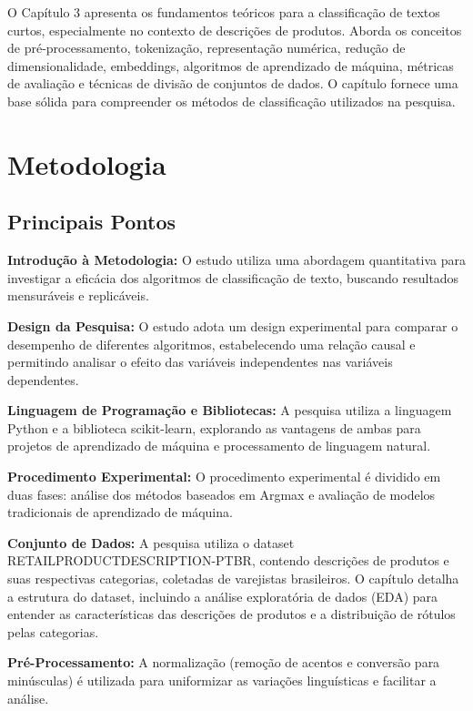 \documentclass{report}
\begin{document}
O Capítulo 3 apresenta os fundamentos teóricos para a classificação de textos curtos, especialmente no contexto de descrições de produtos. Aborda os conceitos de pré-processamento, tokenização, representação numérica, redução de dimensionalidade, embeddings, algoritmos de aprendizado de máquina, métricas de avaliação e técnicas de divisão de conjuntos de dados. O capítulo fornece uma base sólida para compreender os métodos de classificação utilizados na pesquisa.

\chapter{Metodologia}

\section*{Principais Pontos}

\textbf{Introdução à Metodologia:} O estudo utiliza uma abordagem quantitativa para investigar a eficácia dos algoritmos de classificação de texto, buscando resultados mensuráveis e replicáveis.

\textbf{Design da Pesquisa:} O estudo adota um design experimental para comparar o desempenho de diferentes algoritmos, estabelecendo uma relação causal e permitindo analisar o efeito das variáveis independentes nas variáveis dependentes.

\textbf{Linguagem de Programação e Bibliotecas:} A pesquisa utiliza a linguagem Python e a biblioteca scikit-learn, explorando as vantagens de ambas para projetos de aprendizado de máquina e processamento de linguagem natural.

\textbf{Procedimento Experimental:} O procedimento experimental é dividido em duas fases: análise dos métodos baseados em Argmax e avaliação de modelos tradicionais de aprendizado de máquina.

\textbf{Conjunto de Dados:} A pesquisa utiliza o dataset RETAILPRODUCTDESCRIPTION-PTBR, contendo descrições de produtos e suas respectivas categorias, coletadas de varejistas brasileiros. O capítulo detalha a estrutura do dataset, incluindo a análise exploratória de dados (EDA) para entender as características das descrições de produtos e a distribuição de rótulos pelas categorias.

\textbf{Pré-Processamento:} A normalização (remoção de acentos e conversão para minúsculas) é utilizada para uniformizar as variações linguísticas e facilitar a análise.
\end{document}
